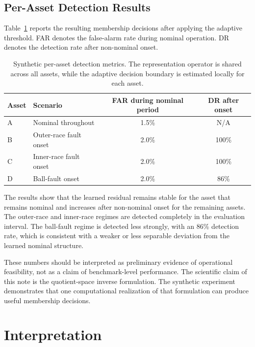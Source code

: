 \documentclass[11pt,letterpaper]{article}
\begin{document}
\subsection{Per-Asset Detection Results}

Table~\ref{tab:synthetic_results} reports the resulting membership decisions after applying the adaptive threshold.
FAR denotes the false-alarm rate during nominal operation.
DR denotes the detection rate after non-nominal onset.

\begin{table}[H]
\centering
\caption{
Synthetic per-asset detection metrics.
The representation operator is shared across all assets, while the adaptive decision boundary is estimated locally for each asset.
}
\label{tab:synthetic_results}
\begin{tabular}{llcc}
\toprule
Asset & Scenario & FAR during nominal period & DR after onset \\
\midrule
A & Nominal throughout       & 1.5\% & N/A \\
B & Outer-race fault onset   & 2.0\% & 100\% \\
C & Inner-race fault onset   & 2.0\% & 100\% \\
D & Ball-fault onset         & 2.0\% & 86\% \\
\bottomrule
\end{tabular}
\end{table}

The results show that the learned residual remains stable for the asset that remains nominal and increases after non-nominal onset for the remaining assets.
The outer-race and inner-race regimes are detected completely in the evaluation interval.
The ball-fault regime is detected less strongly, with an 86\% detection rate, which is consistent with a weaker or less separable deviation from the learned nominal structure.

These numbers should be interpreted as preliminary evidence of operational feasibility, not as a claim of benchmark-level performance.
The scientific claim of this note is the quotient-space inverse formulation.
The synthetic experiment demonstrates that one computational realization of that formulation can produce useful membership decisions.

\section{Interpretation}
\end{document}
